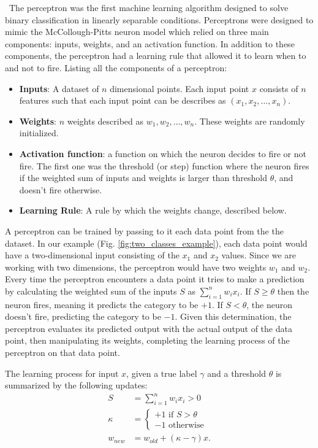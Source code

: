 \
 The perceptron was the first machine learning algorithm designed to solve binary classification in linearly separable conditions. Perceptrons were designed to mimic the McCollough-Pitts neuron model which relied on three main components: inputs, weights, and an activation function. In addition to these components, the perceptron had a learning rule that allowed it to learn when to and not to fire. Listing all the components of a perceptron:
\begin{itemize}
  \item \textbf{Inputs}: A dataset of $n$ dimensional points. Each input point $x$ consists of $n$ features such that each input point can be describes as $(x_1, x_2, \dots, x_n)$.
  \item \textbf{Weights}: $n$ weights described as $w_1, w_2, \dots, w_n$. These weights are randomly initialized.
  \item \textbf{Activation function}: a function on which the neuron decides to fire or not fire. The first one was the threshold (or step) function where the neuron fires if the weighted sum of inputs and weights is larger than threshold $\theta$, and doesn't fire otherwise.
  \item \textbf{Learning Rule}: A rule by which the weights change, described below.
\end{itemize}


A perceptron can be trained by passing to it each data point from the the dataset. In our example (Fig. \ref{fig:two_classes_example}), each data point would have a two-dimensional input consisting of the $x_1$ and $x_2$ values. Since we are working with two dimensions, the perceptron would have two weights $w_1$ and $w_2$. Every time the perceptron encounters a data point it tries to make a prediction by calculating the weighted sum of the inputs $S$  as $\sum_{i=1}^n w_ix_i$. If $S \geq \theta$ then the neuron fires, meaning it predicts the category to be $+1$. If $S < \theta$, the neuron doesn't fire, predicting the category to be $-1$. Given this determination, the perceptron evaluates its predicted output with the actual output of the data point, then manipulating its weights, completing the learning process of the perceptron on that data point. 

The learning process for input $x$, given a true label $\gamma$ and a threshold $\theta$ is summarized by the following updates:
\begin{align}
  S &= \sum_{i=1}^n w_ix_i > 0  \\
  \kappa &= \begin{cases} 
  \label{eq:piecewise_threshold_function}
    +1 \textrm{ if $S$} > \theta \\
    -1 \textrm{ otherwise} 
  \end{cases} \\
  w_{new} &= w_{old} + (\kappa - \gamma)x.
\end{align}

